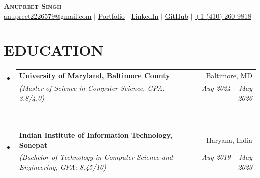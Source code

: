 \documentclass[letterpaper,11pt]{article}
\makeatletter
\newcommand{\SectionListBegin}{\begin{itemize}[leftmargin=0.15in, label={}]}
\newcommand{\SectionListEnd}{\end{itemize}}
\newcommand{\DLSubheadingItem}[4]{
  \vspace{-2pt}\item
    \begin{tabular*}{0.97\textwidth}[t]{l@{\extracolsep{\fill}}r}
      \textbf{#1} & {\small #2} \\
      \textit{\small#3} & \textit{\small #4} \\
    \end{tabular*}\vspace{-7pt}
}
\makeatother
\begin{document}
\begin{center}
	{\textbf{\Huge \scshape Anupreet Singh}} \\ \vspace{1pt}
	\small  \href{mailto:anupreet2226579@gmail.com}{\underline{anupreet2226579@gmail.com}} 
	  $|$ 
	\small {\href{https://portfolio-omega-three-hw8q4rw3hx.vercel.app}{\underline{Portfolio}}}
    $|$ 
	\small {\href{https://www.linkedin.com/in/anupreet-singh-71b1861b8/}{\underline{LinkedIn}}}
    $|$ 
	\small {\href{https://github.com/anupreetsingh}{\underline{GitHub}}}
    $|$ 
{\underline{+1 (410) 260-9818}} 
\end{center}


\section{EDUCATION}
  \SectionListBegin
    \DLSubheadingItem
      {University of Maryland, Baltimore County}{Baltimore, MD}
      {(Master of Science in Computer Science, GPA: 3.8/4.0)}{Aug 2024 -- May 2026}\\
    {\vspace{2mm}}
    \DLSubheadingItem
      {Indian Institute of Information Technology, Sonepat}{Haryana, India}
      {(Bachelor of Technology in Computer Science and Engineering, GPA: 8.45/10)}{Aug 2019 -- May 2023} \\
  \SectionListEnd
  
\end{document}
